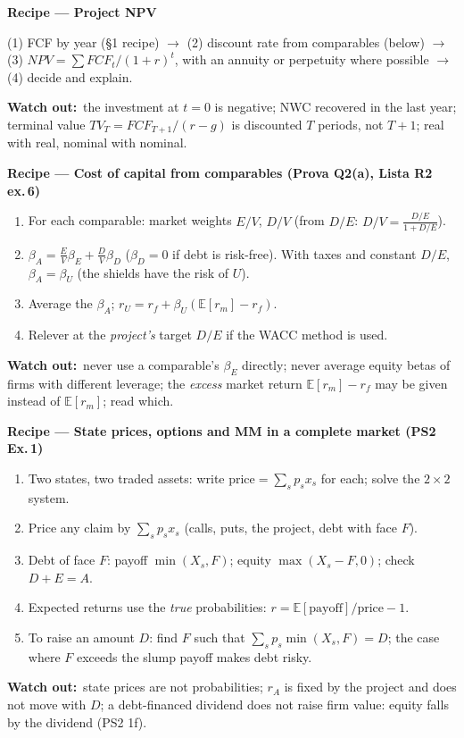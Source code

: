 \documentclass[10pt,a4paper]{article}
\newcommand{\recipe}[1]{\par\smallskip\noindent\textbf{\color{hd}Recipe --- #1}\par}
\newcommand{\watch}{\par\noindent\textbf{\color{wr}Watch out:}~}
\newcommand{\E}{\mathbb{E}}
\begin{document}
\recipe{Project NPV}
(1) FCF by year (§1 recipe) $\to$ (2) discount rate from comparables (below) $\to$ (3) $NPV=\sum
FCF_t/(1+r)^t$, with an annuity or perpetuity where possible $\to$ (4) decide and explain.
\watch the investment at $t=0$ is negative; NWC recovered in the last year; terminal value
$TV_T=FCF_{T+1}/(r-g)$ is discounted $T$ periods, not $T+1$; real with real, nominal with nominal.

\recipe{Cost of capital from comparables (Prova Q2(a), Lista R2 ex.\,6)}
\begin{enumerate}
  \item For each comparable: market weights $E/V$, $D/V$ (from $D/E$: $D/V=\frac{D/E}{1+D/E}$).
  \item $\beta_A=\frac EV\beta_E+\frac DV\beta_D$ ($\beta_D=0$ if debt is risk-free). With taxes and
        constant $D/E$, $\beta_A=\beta_U$ (the shields have the risk of $U$).
  \item Average the $\beta_A$; $r_U=r_f+\beta_U(\E[r_m]-r_f)$.
  \item Relever at the \emph{project's} target $D/E$ if the WACC method is used.
\end{enumerate}
\watch never use a comparable's $\beta_E$ directly; never average equity betas of firms with different
leverage; the \emph{excess} market return $\E[r_m]-r_f$ may be given instead of $\E[r_m]$; read which.

\recipe{State prices, options and MM in a complete market (PS2 Ex.\,1)}
\begin{enumerate}
  \item Two states, two traded assets: write $\text{price}=\sum_s p_s x_s$ for each; solve the
        $2\times2$ system.
  \item Price any claim by $\sum_s p_sx_s$ (calls, puts, the project, debt with face $F$).
  \item Debt of face $F$: payoff $\min(X_s,F)$; equity $\max(X_s-F,0)$; check $D+E=A$.
  \item Expected returns use the \emph{true} probabilities: $r=\E[\text{payoff}]/\text{price}-1$.
  \item To raise an amount $D$: find $F$ such that $\sum_s p_s\min(X_s,F)=D$; the case where $F$
        exceeds the slump payoff makes debt risky.
\end{enumerate}
\watch state prices are not probabilities; $r_A$ is fixed by the project and does not move with $D$;
a debt-financed dividend does not raise firm value: equity falls by the dividend (PS2 1f).
\end{document}
